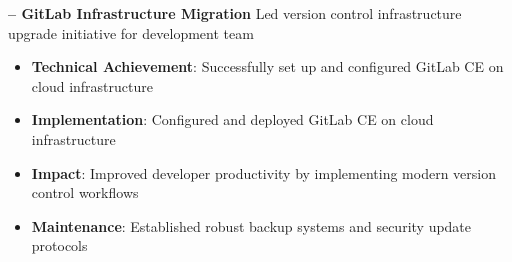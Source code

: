 \begin{sectionContainer}
	\vspace{0.4em}\noindent\large\textbf{– GitLab Infrastructure Migration}
	\vspace{0.8em} \newline
	\noindent Led version control infrastructure upgrade initiative for development team
	\begin{itemize}[leftmargin=*, nosep, itemsep=0.4em, before=\vspace{0.6em}, after=\vspace{0.8em}, label={}]
		\item \textbf{Technical Achievement}: Successfully set up and configured GitLab CE on cloud infrastructure
		\item \textbf{Implementation}: Configured and deployed GitLab CE on cloud infrastructure
		\item \textbf{Impact}: Improved developer productivity by implementing modern version control workflows
		\item \textbf{Maintenance}: Established robust backup systems and security update protocols
	\end{itemize}
\end{sectionContainer}

\texthr{}


